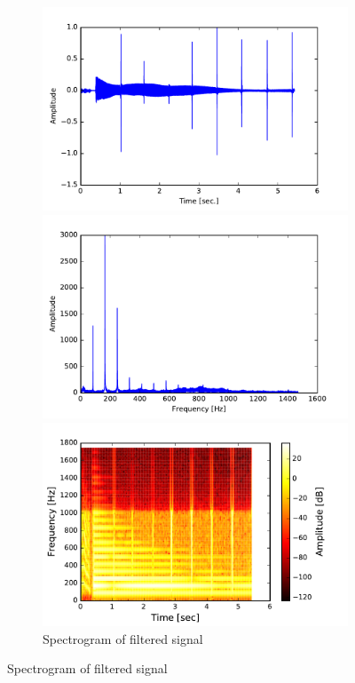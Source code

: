 \begin{figure}[H]
\centering
\begin{subfigure}{0.49\textwidth}
\centering
\includegraphics[width=\textwidth]{figures/validation/integration/signal.pdf}
\caption{Input signal with noise}
\label{fig:inte_signal}

\includegraphics[width=\textwidth]{figures/validation/integration/f_signal.pdf}
\caption{Frequency spectrum of signal with noise}
\label{fig:inte_SIGNAL}
\includegraphics[width=\textwidth]{figures/validation/integration/spectrogram.pdf}
\caption{Spectrogram of filtered signal}
\label{fig:inte_spec}


\end{subfigure}
\end{figure}
